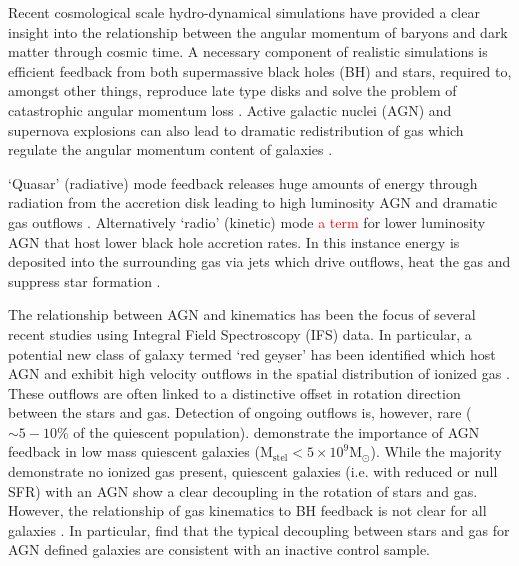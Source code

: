 \documentclass[fleqn,usenatbib]{mnras}
\newcommand{\red}[1]{{\textcolor{red}{#1}}}
\begin{document}
Recent cosmological scale hydro-dynamical simulations have provided a clear insight into the relationship between the angular momentum of baryons and dark matter through cosmic time. A necessary component of realistic simulations is efficient feedback from both supermassive black holes (BH) and stars, required to, amongst other things, reproduce late type disks and solve the problem of catastrophic angular momentum loss \citep[e.g.][]{zavala2008, scannapieco2009}. Active galactic nuclei (AGN) and supernova explosions can also lead to dramatic redistribution of gas which regulate the angular momentum content of galaxies \citep[e.g.][]{genel2015, DeFelippis2017}. 

`Quasar' (radiative) mode feedback releases huge amounts of energy through radiation from the accretion disk leading to high luminosity AGN and dramatic gas outflows \citep[e.g.][]{cattaneo2009, rubin2014, cheung2016}. Alternatively `radio' (kinetic) mode \red{a term} for lower luminosity AGN that host lower black hole accretion rates. In this instance energy is deposited into the surrounding gas via jets which drive outflows, heat the gas and suppress star formation \citep[][]{binney1995, ciotti2001, heckman2014}.

The relationship between AGN and kinematics has been the focus of several recent studies using Integral Field Spectroscopy (IFS) data. In particular, a potential new class of galaxy termed `red geyser' has been identified which host AGN and exhibit high velocity outflows in the spatial distribution of ionized gas \citep[][]{cheung2016, roy2018}. These outflows are often linked to a distinctive offset in rotation direction between the stars and gas. Detection of ongoing outflows is, however, rare ($\sim5-10$\% of the quiescent population). \citet{penny2018} demonstrate the importance of AGN feedback in low mass quiescent galaxies ($\mathrm{M_{stel} < 5 \times 10^{9}M_{\odot}}$). While the majority demonstrate no ionized gas present, quiescent galaxies (i.e. with reduced or null SFR) with an AGN show a clear decoupling in the rotation of stars and gas. However, the relationship of gas kinematics to BH feedback is not clear for all galaxies \citep[see also:][]{koudmani2019}. In particular, \citet{ilha2019} find that the typical decoupling between stars and gas for AGN defined galaxies are consistent with an inactive control sample. 
\end{document}
